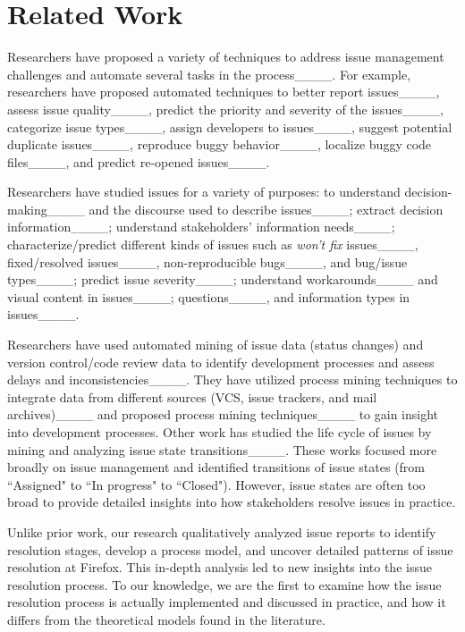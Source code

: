 \section{Related Work}
\label{sec:related_work}







Researchers have proposed a variety of techniques to address issue management challenges and automate several tasks in the process____. For example, researchers have proposed automated techniques to better report issues____, assess issue quality____, 
predict the priority and severity of the issues____, categorize issue types____, assign developers to issues____, suggest potential duplicate issues____, reproduce buggy behavior____, localize buggy code files____,  and predict re-opened issues____. 

Researchers have studied issues for a variety of purposes: to understand  decision-making____ and 
the discourse used to describe issues____; extract decision information____; understand stakeholders' information needs____; characterize/predict different kinds of issues such as \textit{won't fix} issues____, fixed/resolved issues____, non-reproducible bugs____, and bug/issue types____; predict issue severity____; understand workarounds____ and visual content in issues____;  
questions____, and information types in issues____.










Researchers have used automated mining of issue data (\eg status changes) and version control/code review data to identify development processes and assess delays and inconsistencies____. 
They have utilized process mining techniques to integrate data from different sources (\eg VCS, issue trackers, and mail archives)____ and proposed process mining techniques____ to gain insight into development processes. Other work has studied the life cycle of issues by mining and analyzing issue state transitions____.
These works focused more broadly on issue management and identified transitions of issue states (\eg from ``Assigned" to ``In progress" to ``Closed"). 
However, issue states are often too broad to provide detailed insights into how stakeholders resolve issues in practice.




Unlike prior work, our research qualitatively analyzed issue reports to identify resolution stages, develop a process model, and uncover detailed patterns of issue resolution at Firefox. This in-depth analysis led to new insights into the issue resolution process. To our knowledge, we are the first to examine how the issue resolution process is actually implemented and discussed in practice, and how it differs from the theoretical models found in the literature.